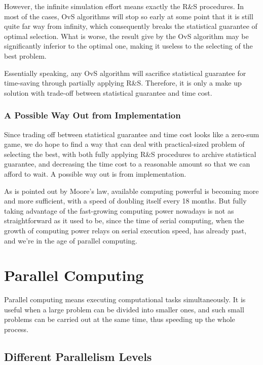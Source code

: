 \documentclass[12pt,a4]{report}
\begin{document}
However, the infinite simulation effort means exactly the R\&S procedures. In most of the cases, OvS algorithms will stop so early at some point that it is still quite far way from infinity, which consequently breaks the statistical guarantee of optimal selection. What is worse, the result give by the OvS algorithm may be significantly inferior to the optimal one, making it useless to the selecting of the best problem. 

Essentially speaking, any OvS algorithm will sacrifice statistical guarantee for time-saving through partially applying R\&S. Therefore, it is only a make up solution with trade-off between statistical guarantee and time cost.

\subsection{A Possible Way Out from Implementation}

Since trading off between statistical guarantee and time cost looks like a zero-sum game, we do hope to find a way that can deal with practical-sized problem of selecting the best, with both fully applying R\&S procedures to archive statistical guarantee, and decreasing the time cost to a reasonable amount so that we can afford to wait. A possible way out is from implementation.

As is pointed out by Moore's law, available computing powerful is becoming more and more sufficient, with a speed of doubling itself every 18 months. But fully taking advantage of the fast-growing computing power nowadays is not as straightforward as it used to be, since the time of serial computing, when the growth of computing power relays on serial execution speed, has already past, and we're in the age of parallel computing.

\chapter{Parallel Computing}

Parallel computing means executing computational tasks simultaneously. It is useful when a large problem can be divided into smaller ones, and such small problems can be carried out at the same time, thus speeding up the whole process.

\section{Different Parallelism Levels}
\end{document}
